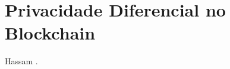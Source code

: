 \section{Privacidade Diferencial no Blockchain}
Hassam \cite{Hassan2020}. %

% 
% 
% 
% 
% 
% 
% 
% 
% 
% 
% 
% 
